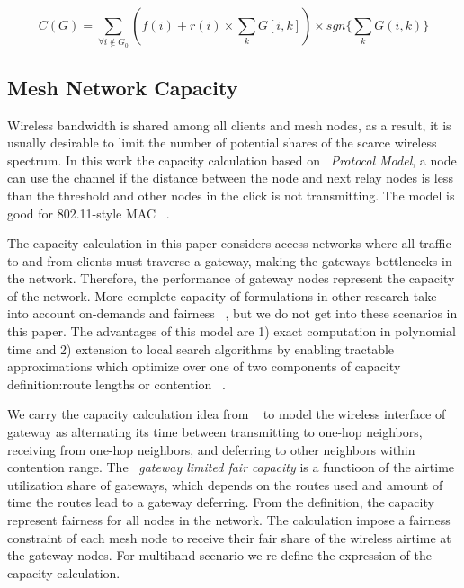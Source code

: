 \begin{equation}
\label{eq:cost}
C(G)=\sum_{\forall i\notin G_0} (f(i)+r(i)\times \sum_kG[i,k]) \times sgn\{\sum_kG(i,k)\}
\end{equation}





\subsection{Mesh Network Capacity}
\label{subsec:capacity}
Wireless bandwidth is shared among all clients and mesh nodes, as a result, it is usually desirable to limit the number of potential shares of the scarce wireless spectrum. 
In this work the capacity calculation based on ~\emph{Protocol Model}, a node can use the channel if the distance between the node and next relay nodes is less than the threshold and other nodes in the click is not transmitting. The model is good for 802.11-style MAC ~\cite{jain2005impact}.

The capacity calculation in this paper considers access networks where all traffic to and from clients must traverse a gateway, making the gateways bottlenecks in the network. 
Therefore, the performance of gateway nodes represent the capacity of the network. 
More complete capacity of formulations in other research take into account on-demands and fairness ~\cite{arkoulis2013optimal}, but we do not get into these scenarios in this paper.
The advantages of this model are 1) exact computation in polynomial time and 2) extension to local search algorithms by enabling tractable approximations which optimize over one of two components of capacity definition:route lengths or contention ~\cite{robinson2008adding}.

We carry the capacity calculation idea from ~\cite{robinson2008adding} to model the wireless interface of gateway as alternating its time between transmitting to one-hop neighbors, receiving from one-hop neighbors, and deferring to other neighbors within contention range. 
The ~\emph{gateway limited fair capacity} is a functioon of the airtime utilization share of gateways, which depends on the routes used and amount of time the routes lead to a gateway deferring. From the definition, the capacity represent fairness for all nodes in the network. 
The calculation impose a fairness constraint of each mesh node to receive their fair share of the wireless airtime at the gateway nodes. 
For multiband scenario we re-define the expression of the capacity calculation.

